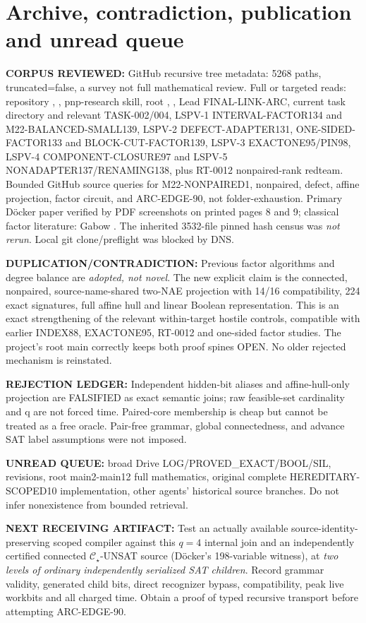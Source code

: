 \documentclass[11pt]{article}
\newcommand{\CS}{\mathcal C_{\star}}
\begin{document}
\section{Archive, contradiction, publication and unread queue}
\noindent\textbf{CORPUS REVIEWED:} GitHub recursive tree metadata: 5268 paths, truncated=false, a survey not full mathematical review. Full or targeted reads: repository , , pnp-research skill, root , , Lead FINAL-LINK-ARC, current task directory and relevant TASK-002/004, LSPV-1 INTERVAL-FACTOR134 and M22-BALANCED-SMALL139, LSPV-2 DEFECT-ADAPTER131, ONE-SIDED-FACTOR133 and BLOCK-CUT-FACTOR139, LSPV-3 EXACTONE95/PIN98, LSPV-4 COMPONENT-CLOSURE97 and LSPV-5 NONADAPTER137/RENAMING138, plus RT-0012 nonpaired-rank redteam. Bounded GitHub source queries for M22-NONPAIRED1, nonpaired, defect, affine projection, factor circuit, and ARC-EDGE-90, not folder-exhaustion. Primary D\"ocker paper verified by PDF screenshots on printed pages 8 and 9; classical factor literature: Gabow \cite{gabow}. The inherited 3532-file pinned hash census was \emph{not rerun}. Local git clone/preflight was blocked by DNS.

\noindent\textbf{DUPLICATION/CONTRADICTION:} Previous factor algorithms and degree balance are \emph{adopted, not novel}. The new explicit claim is the connected, nonpaired, source-name-shared two-NAE projection with 14/16 compatibility, 224 exact signatures, full affine hull and linear Boolean representation. This is an exact strengthening of the relevant within-target hostile controls, compatible with earlier INDEX88, EXACTONE95, RT-0012 and one-sided factor studies. The project's root main correctly keeps both proof spines OPEN. No older rejected mechanism is reinstated.

\noindent\textbf{REJECTION LEDGER:} Independent hidden-bit aliases and affine-hull-only projection are FALSIFIED as exact semantic joins; raw feasible-set cardinality and q are not forced time. Paired-core membership is cheap but cannot be treated as a free oracle. Pair-free grammar, global connectedness, and advance SAT label assumptions were not imposed.

\noindent\textbf{UNREAD QUEUE:} broad Drive LOG/PROVED_EXACT/BOOL/SIL, revisions, root main2-main12 full mathematics, original complete HEREDITARY-SCOPED10 implementation, other agents' historical source branches. Do not infer nonexistence from bounded retrieval.

\noindent\textbf{NEXT RECEIVING ARTIFACT:} Test an actually available source-identity-preserving scoped compiler against this $q=4$ internal join and an independently certified connected $\CS$-UNSAT source (D\"ocker's 198-variable witness), at \emph{two levels of ordinary independently serialized SAT children}. Record grammar validity, generated child bits, direct recognizer bypass, compatibility, peak live workbits and all charged time. Obtain a proof of typed recursive transport before attempting ARC-EDGE-90.
\end{document}
